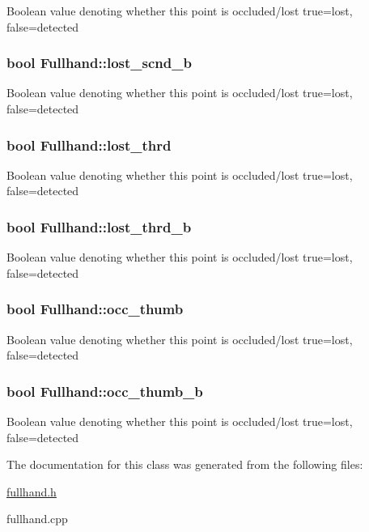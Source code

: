 \label{classFullhand_a3f1d564d16316785f7c94ee2c302e59f}
Boolean value denoting whether this point is occluded/lost true=lost, false=detected \hypertarget{classFullhand_aaefe4741e3ddeb3fcb7525633df31fd0}{
\subsubsection[{lost\_\-scnd\_\-b}]{\setlength{\rightskip}{0pt plus 5cm}bool {\bf Fullhand::lost\_\-scnd\_\-b}}}
\label{classFullhand_aaefe4741e3ddeb3fcb7525633df31fd0}
Boolean value denoting whether this point is occluded/lost true=lost, false=detected \hypertarget{classFullhand_a26ec6d3639ec7cfa414d22f3ffc83663}{
\subsubsection[{lost\_\-thrd}]{\setlength{\rightskip}{0pt plus 5cm}bool {\bf Fullhand::lost\_\-thrd}}}
\label{classFullhand_a26ec6d3639ec7cfa414d22f3ffc83663}
Boolean value denoting whether this point is occluded/lost true=lost, false=detected \hypertarget{classFullhand_a90731df9ecf27e13954ea3bea51dc5f2}{
\subsubsection[{lost\_\-thrd\_\-b}]{\setlength{\rightskip}{0pt plus 5cm}bool {\bf Fullhand::lost\_\-thrd\_\-b}}}
\label{classFullhand_a90731df9ecf27e13954ea3bea51dc5f2}
Boolean value denoting whether this point is occluded/lost true=lost, false=detected \hypertarget{classFullhand_a9538ee796a33099f747d8972d9747816}{
\subsubsection[{occ\_\-thumb}]{\setlength{\rightskip}{0pt plus 5cm}bool {\bf Fullhand::occ\_\-thumb}}}
\label{classFullhand_a9538ee796a33099f747d8972d9747816}
Boolean value denoting whether this point is occluded/lost true=lost, false=detected \hypertarget{classFullhand_ae87bfe0cecb5ca9a366d7850c8c8bdd1}{
\subsubsection[{occ\_\-thumb\_\-b}]{\setlength{\rightskip}{0pt plus 5cm}bool {\bf Fullhand::occ\_\-thumb\_\-b}}}
\label{classFullhand_ae87bfe0cecb5ca9a366d7850c8c8bdd1}
Boolean value denoting whether this point is occluded/lost true=lost, false=detected 

The documentation for this class was generated from the following files:\begin{DoxyCompactItemize}
\item 
\hyperlink{fullhand_8h}{fullhand.h}\item 
fullhand.cpp\end{DoxyCompactItemize}
